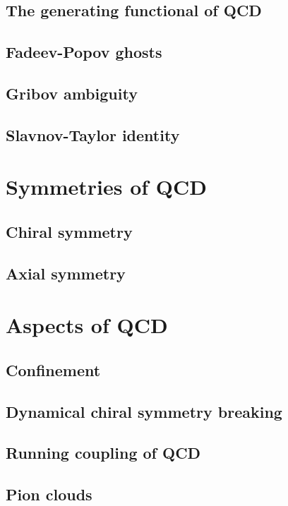 	
	
	\subsection{The generating functional of QCD}
	\subsection{Fadeev-Popov ghosts} 
	\subsection{Gribov ambiguity}
	\subsection{Slavnov-Taylor identity}
	
\section{Symmetries of QCD}
	\subsection{Chiral symmetry}
	\subsection{Axial symmetry}
	
\section{Aspects of QCD}
	\subsection{Confinement}
	\subsection{Dynamical chiral symmetry breaking}
	\subsection{Running coupling of QCD}
	\subsection{Pion clouds}